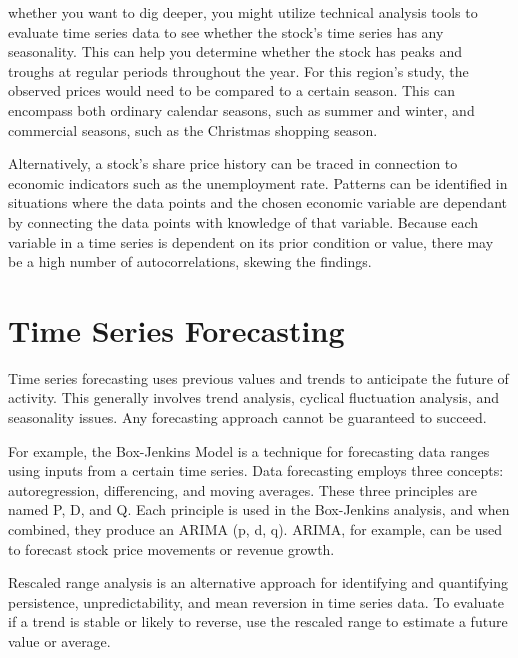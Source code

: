 whether you want to dig deeper, you might utilize technical analysis tools to evaluate time series data to see whether the stock's time series has any seasonality. This can help you determine whether the stock has peaks and troughs at regular periods throughout the year. For this region's study, the observed prices would need to be compared to a certain season. This can encompass both ordinary calendar seasons, such as summer and winter, and commercial seasons, such as the Christmas shopping season.

Alternatively, a stock's share price history can be traced in connection to economic indicators such as the unemployment rate. Patterns can be identified in situations where the data points and the chosen economic variable are dependant by connecting the data points with knowledge of that variable. Because each variable in a time series is dependent on its prior condition or value, there may be a high number of autocorrelations, skewing the findings.



\section{Time Series Forecasting} %
\label{sec:intro_sum_results} %
Time series forecasting uses previous values and trends to anticipate the future of activity. This generally involves trend analysis, cyclical fluctuation analysis, and seasonality issues. Any forecasting approach cannot be guaranteed to succeed.

For example, the Box-Jenkins Model is a technique for forecasting data ranges using inputs from a certain time series. Data forecasting employs three concepts: autoregression, differencing, and moving averages. These three principles are named P, D, and Q. Each principle is used in the Box-Jenkins analysis, and when combined, they produce an ARIMA (p, d, q). ARIMA, for example, can be used to forecast stock price movements or revenue growth.

Rescaled range analysis is an alternative approach for identifying and quantifying persistence, unpredictability, and mean reversion in time series data. To evaluate if a trend is stable or likely to reverse, use the rescaled range to estimate a future value or average.

